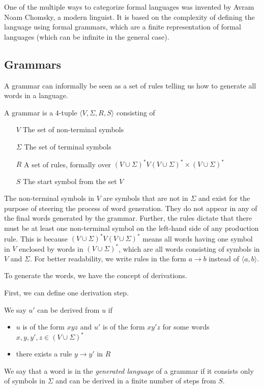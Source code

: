 One of the multiple ways to categorize formal languages was invented by Avram Noam Chomsky, a modern linguist.
It is based on the complexity of defining the language using formal grammars, which are a finite representation of formal languages (which can be infinite in the general case).

\subsection{Grammars}\label{subsec:grammars}

A grammar can informally be seen as a set of rules telling us how to generate all words in a language.

\begin{define}[Grammar]
    A grammar is a 4-tuple $\langle V, \Sigma, R, S \rangle$ consisting of
    \begin{itemize}
        \item[$V$] The set of non-terminal symbols
        \item[$\Sigma$] The set of terminal symbols
        \item[$R$] A set of rules, formally over $(V \cup \Sigma)^{*}V(V \cup \Sigma)^{*} \times (V \cup \Sigma)^{*}$
        \item[$S$] The start symbol from the set $V$
    \end{itemize}
\end{define}

The non-terminal symbols in $V$ are symbols that are not in $\Sigma$ and exist for the purpose of steering the process of word generation.
They do not appear in any of the final words generated by the grammar.
Further, the rules dictate that there must be at least one non-terminal symbol on the left-hand side of any production rule.
This is because $(V \cup \Sigma)^{*}V(V \cup \Sigma)^{*}$ means all words having one symbol in $V$ enclosed by words in $(V \cup \Sigma)^{*}$, which are all words consisting of symbols in $V$ and $\Sigma$.
For better readability, we write rules in the form $a \to b$ instead of $\langle a, b \rangle$.

To generate the words, we have the concept of derivations.
\begin{define}[Derivation]
    First, we can define one derivation step.

    We say $u'$ can be derived from $u$ if
    \begin{itemize}
        \setlength\itemsep{0.2em}
        \item $u$ is of the form $xyz$ and $u'$ is of the form $xy'z$ for some words $x, y, y', z \in (V \cup \Sigma)^*$
        \item there exists a rule $y \to y'$ in $R$
    \end{itemize}

    We say that a word is in the \emph{generated language} of a grammar if it consists only of symbols in $\Sigma$ and can be derived in a finite number of steps from $S$.
\end{define}

